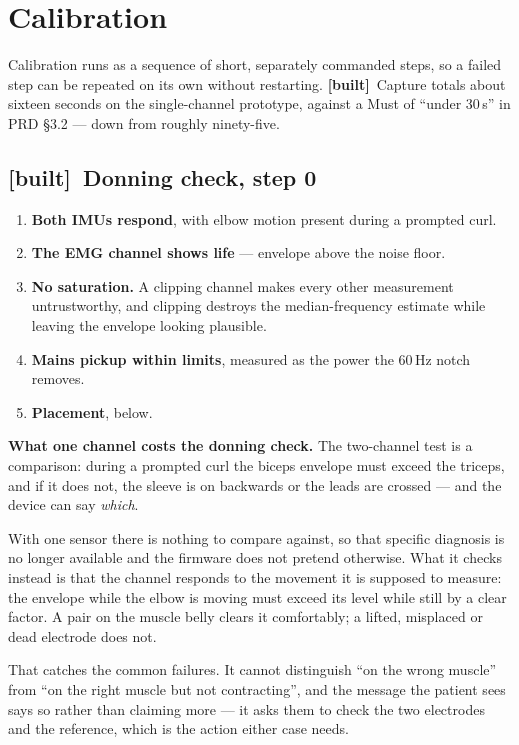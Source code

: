 \documentclass[11pt]{article}
\newcommand{\built}{{\sffamily\scriptsize\color{good}\textbf{[built]}}\ }
\begin{document}
\section{Calibration}
\label{sec:calib}

Calibration runs as a sequence of short, separately commanded steps, so a
failed step can be repeated on its own without restarting. \built Capture
totals about sixteen seconds on the single-channel prototype, against a Must
of ``under 30\,s'' in PRD \S3.2 --- down from roughly ninety-five.

\subsection{\built Donning check, step 0}

\begin{enumerate}
\item \textbf{Both IMUs respond}, with elbow motion present during a prompted
curl.
\item \textbf{The EMG channel shows life} --- envelope above the noise floor.
\item \textbf{No saturation.} A clipping channel makes every other measurement
untrustworthy, and clipping destroys the median-frequency estimate while
leaving the envelope looking plausible.
\item \textbf{Mains pickup within limits}, measured as the power the 60\,Hz
notch removes.
\item \textbf{Placement}, below.
\end{enumerate}

\begin{callout}
\textbf{What one channel costs the donning check.} The two-channel test is a
comparison: during a prompted curl the biceps envelope must exceed the
triceps, and if it does not, the sleeve is on backwards or the leads are
crossed --- and the device can say \emph{which}.

\medskip
With one sensor there is nothing to compare against, so that specific
diagnosis is no longer available and the firmware does not pretend otherwise.
What it checks instead is that the channel responds to the movement it is
supposed to measure: the envelope while the elbow is moving must exceed its
level while still by a clear factor. A pair on the muscle belly clears it
comfortably; a lifted, misplaced or dead electrode does not.

\medskip
That catches the common failures. It cannot distinguish ``on the wrong
muscle'' from ``on the right muscle but not contracting'', and the message
the patient sees says so rather than claiming more --- it asks them to check
the two electrodes and the reference, which is the action either case needs.
\end{callout}
\end{document}
